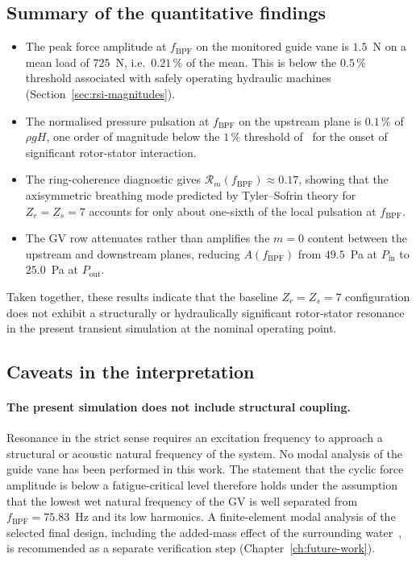 \subsection{Summary of the quantitative findings}
\label{sec:results-fft-summary}

\begin{itemize}
  \item The peak force amplitude at $f_{\mathrm{BPF}}$ on the
        monitored guide vane is $1.5$~N on a mean load of
        $725$~N, i.e.\ $0.21\,\%$ of the mean. This is below the
        $0.5\,\%$ threshold associated with safely operating
        hydraulic machines (Section~\ref{sec:rsi-magnitudes}).
  \item The normalised pressure pulsation at $f_{\mathrm{BPF}}$ on
        the upstream plane is $0.1\,\%$ of $\rho g H$, one order of
        magnitude below the $1\,\%$ threshold
        of~\cite{brekke,brekke2010} for the onset of significant
        rotor-stator interaction.
  \item The ring-coherence diagnostic gives
        $\mathcal{R}_m(f_{\mathrm{BPF}}) \approx 0.17$, showing
        that the axisymmetric breathing mode predicted by
        Tyler--Sofrin theory for $Z_r = Z_s = 7$ accounts for only
        about one-sixth of the local pulsation at
        $f_{\mathrm{BPF}}$.
  \item The \ac{GV} row attenuates rather than amplifies the $m=0$
        content between the upstream and downstream planes,
        reducing $A(f_{\mathrm{BPF}})$ from $49.5$~Pa at
        $P_{\mathrm{in}}$ to $25.0$~Pa at $P_{\mathrm{out}}$.
\end{itemize}

Taken together, these results indicate that the baseline
$Z_r = Z_s = 7$ configuration does not exhibit a structurally or
hydraulically significant rotor-stator resonance in the present
transient simulation at the nominal operating point.

\subsection{Caveats in the interpretation}
\label{sec:results-fft-caveats}

\paragraph{The present simulation does not include structural
coupling.} Resonance in the strict sense requires an excitation
frequency to approach a structural or acoustic natural frequency of
the system. No modal analysis of the guide vane has been performed
in this work. The statement that the cyclic force amplitude is
below a fatigue-critical level therefore holds under the assumption
that the lowest wet natural frequency of the \ac{GV} is well
separated from $f_{\mathrm{BPF}} = 75.83$~Hz and its low harmonics.
A finite-element modal analysis of the selected final design,
including the added-mass effect of the surrounding
water~\cite{valentin2015}, is recommended as a separate
verification step (Chapter~\ref{ch:future-work}).

